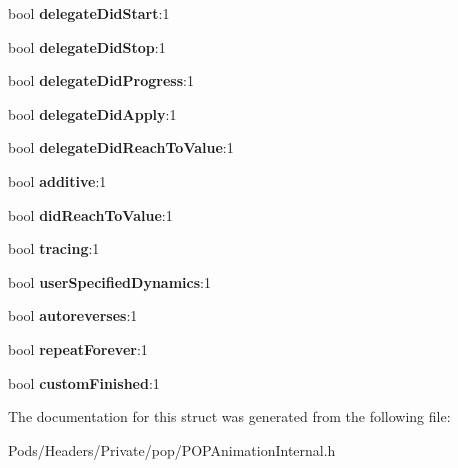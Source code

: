\begin{DoxyCompactItemize}
bool {\bfseries delegate\+Did\+Start}\+:1
\item 
\mbox{\label{struct___p_o_p_animation_state_af642aaecb0c16e6ac91fe47f647e3adb}} 
bool {\bfseries delegate\+Did\+Stop}\+:1
\item 
\mbox{\label{struct___p_o_p_animation_state_a661cdb705a55c94ef8c23a659e835a4b}} 
bool {\bfseries delegate\+Did\+Progress}\+:1
\item 
\mbox{\label{struct___p_o_p_animation_state_a545adde366841e22b391c7129e7f14db}} 
bool {\bfseries delegate\+Did\+Apply}\+:1
\item 
\mbox{\label{struct___p_o_p_animation_state_af0623a8438f79ed73626cadd8804d3e4}} 
bool {\bfseries delegate\+Did\+Reach\+To\+Value}\+:1
\item 
\mbox{\label{struct___p_o_p_animation_state_a8db3421d2e4c70a09315a3ff5e61d2bd}} 
bool {\bfseries additive}\+:1
\item 
\mbox{\label{struct___p_o_p_animation_state_a392c6109cea9f6aaeeea908f90424f9d}} 
bool {\bfseries did\+Reach\+To\+Value}\+:1
\item 
\mbox{\label{struct___p_o_p_animation_state_a1ad2d30015537064e8bac4e6febbe4be}} 
bool {\bfseries tracing}\+:1
\item 
\mbox{\label{struct___p_o_p_animation_state_aa1034545475c52443352387dc6403362}} 
bool {\bfseries user\+Specified\+Dynamics}\+:1
\item 
\mbox{\label{struct___p_o_p_animation_state_ad3bda88c86a50b0495e4822979b418e7}} 
bool {\bfseries autoreverses}\+:1
\item 
\mbox{\label{struct___p_o_p_animation_state_a8c2bffa8c4117b0105b636167d71ea53}} 
bool {\bfseries repeat\+Forever}\+:1
\item 
\mbox{\label{struct___p_o_p_animation_state_ad129b9baba97efbbc96ae410d7b8f683}} 
bool {\bfseries custom\+Finished}\+:1
\end{DoxyCompactItemize}


The documentation for this struct was generated from the following file\+:\begin{DoxyCompactItemize}
\item 
Pods/\+Headers/\+Private/pop/P\+O\+P\+Animation\+Internal.\+h\end{DoxyCompactItemize}
